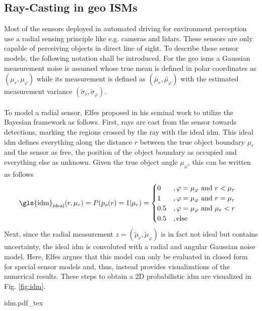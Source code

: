 \subsection{Ray-Casting in geo ISMs}
\label{subsec:ray_casting}
Most of the sensors deployed in automated driving for environment perception use a radial sensing principle like e.g. cameras and lidars. These sensors are only capable of perceiving objects in direct line of sight. To describe these sensor models, the following notation shall be introduced. For the geo \gls{ism}s a Gaussian measurement noise is assumed whose true mean is defined in polar coordinates as $(\mu_r, \mu_\varphi)$ while its measurement is defined as $(\tilde{\mu_r}, \tilde{\mu_\varphi})$ with the estimated measurement variance $(\tilde{\sigma}_r, \tilde{\sigma}_\varphi)$.
\\\\
To model a radial sensor, Elfes \cite{elfes1989using} proposed in his seminal work to utilize the Bayesian framework as follows. First, rays are cast from the sensor towards detections, marking the regions crossed by the ray with the ideal \gls{idm}. This ideal \gls{idm} defines everything along the distance $r$ between the true object boundary $\mu_r$ and the sensor as free, the position of the object boundary as occupied and everything else as unknown. Given the true object angle $\mu_{\varphi}$,  this can be written as follows 
\begin{align}
	\label{eq:ideal_idm}
	\text{\gls{idm}}_{\text{ideal}}(r,\mu_r) = P(p_o(r) = 1 |\mu_r) &= 
	\begin{cases}
		0 &, \varphi = \mu_{\varphi} \text{ and } r < \mu_r\\
		1 &, \varphi = \mu_{\varphi} \text{ and }r = \mu_r\\
		0.5 &, \varphi = \mu_{\varphi} \text{ and } \mu_r < r\\				
		0.5 &, \text{else}		
	\end{cases}
\end{align}
Next, since the radial measurement $z = (\tilde{\mu}_r, \tilde{\mu}_{\varphi})$ is in fact not ideal but contains uncertainty, the ideal \gls{idm} is convoluted with a radial and angular Gaussian noise model. Here, Elfes argues that this model can only be evaluated in closed form for special sensor models and, thus, instead provides visualizations of the numerical results. These steps to obtain a 2D probabilistic \gls{idm} are visualized in Fig. \ref{fig:idm}.
\begin{center}
	{idm.pdf_tex}
\end{center}
